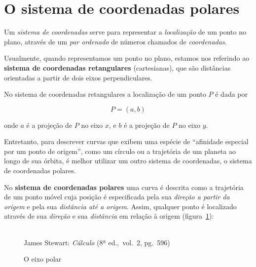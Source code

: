 \section{O sistema de coordenadas polares}
\label{sec:coordpolar}

Um \emph{sistema de coordenadas} serve para representar a \emph{localização}
de um ponto no plano, através de um \emph{par ordenado} de números
chamados de \emph{coordenadas}.

Usualmente, quando representamos um ponto no plano, estamos nos
referindo ao \textbf{sistema de coordenadas retangulares}
(cartesianas), que são distâncias orientadas a partir de dois eixos
perpendiculares.

No sistema de coordenadas retangulares a localização de um ponto
$P$ é dada por

\begin{equation}
  P = (a, b)
\end{equation}

\noindent onde $a$ é a projeção de $P$ no eixo $x$, e $b$ é a projeção de $P$ no
eixo $y$.

Entretanto, para descrever curvas que exibem uma espécie de ``afinidade especial
por um ponto de origem'', como um círculo ou a trajetória de um
planeta ao longo de sua órbita, é melhor utilizar um outro sistema de
coordenadas, o sistema de coordenadas polares.

No \textbf{sistema de coordenadas polares} uma curva é descrita como a
trajetória de um ponto móvel cuja posição é especificada pela sua
\emph{direção a partir da origem} e pela sua \emph{distância até a
  origem}. Assim, qualquer ponto é localizado através de sua
\emph{direção} e sua \emph{distância} em relação à origem
(figura~\ref{fig:eixopolar}):

\begin{figure}[H]
  \begin{center}
    \caption{O eixo polar}
    \label{fig:eixopolar}
    \\
    \footnotesize{James Stewart: \emph{Cálculo} (8ª ed.,\ vol.\ 2,
      pg.\ 596)}
  \end{center}
\end{figure}


